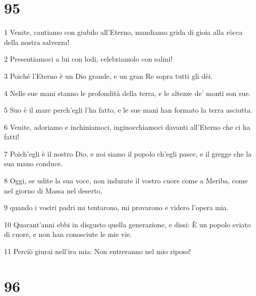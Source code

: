 \chapter{95}

\par 1 Venite, cantiamo con giubilo all'Eterno, mandiamo grida di gioia alla ròcca della nostra salvezza!
\par 2 Presentiamoci a lui con lodi, celebriamolo con salmi!
\par 3 Poiché l'Eterno è un Dio grande, e un gran Re sopra tutti gli dèi.
\par 4 Nelle sue mani stanno le profondità della terra, e le altezze de' monti son sue.
\par 5 Suo è il mare perch'egli l'ha fatto, e le sue mani han formato la terra asciutta.
\par 6 Venite, adoriamo e inchiniamoci, inginocchiamoci davanti all'Eterno che ci ha fatti!
\par 7 Poich'egli è il nostro Dio, e noi siamo il popolo ch'egli pasce, e il gregge che la sua mano conduce.
\par 8 Oggi, se udite la sua voce, non indurate il vostro cuore come a Meriba, come nel giorno di Massa nel deserto,
\par 9 quando i vostri padri mi tentarono, mi provarono e videro l'opera mia.
\par 10 Quarant'anni ebbi in disgusto quella generazione, e dissi: È un popolo sviato di cuore, e non han conosciute le mie vie.
\par 11 Perciò giurai nell'ira mia: Non entreranno nel mio riposo!

\chapter{96}

